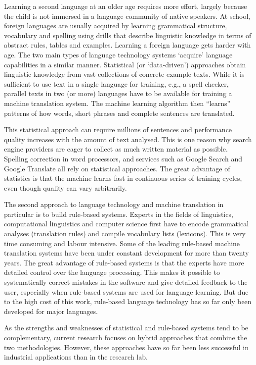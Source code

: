 \documentclass[]{../../metanetpaper}
\begin{document}
\begin{multicols}{2}
Learning a second language at an older age requires more effort, largely
because the child is not immersed in a language community of native speakers.
At school, foreign languages are usually acquired by learning grammatical
structure, vocabulary and spelling using drills that describe linguistic
knowledge in terms of abstract rules, tables and examples. Learning a foreign
language gets harder with age.
The two main types of language technology systems ‘acquire’ language
capabilities in a similar manner. Statistical (or ‘data-driven’) approaches
obtain linguistic knowledge from vast collections of concrete example texts.
While it is sufficient to use text in a single language for training, e.g., a
spell checker, parallel texts in two (or more) languages have to be available
for training a machine translation system. The machine learning algorithm then
“learns” patterns of how words, short phrases and complete sentences are
translated.

This statistical approach can require millions of sentences and performance
quality increases with the amount of text analysed. This is one reason why
search engine providers are eager to collect as much written material as
possible. Spelling correction in word processors, and services such as Google
Search and Google Translate all rely on statistical approaches. The great
advantage of statistics is that the machine learns fast in continuous series of
training cycles, even though quality can vary arbitrarily.

The second approach to language technology and machine translation in
particular is to build rule-based systems. Experts in the fields of
linguistics, computational linguistics and computer science first have to
encode grammatical analyses (translation rules) and compile vocabulary lists
(lexicons). This is very time consuming and labour intensive. Some of the
leading rule-based machine translation systems have been under constant
development for more than twenty years. The great advantage of rule-based
systems is that the experts have more detailed control over the language
processing. This makes it possible to systematically correct mistakes in the
software and give detailed feedback to the user, especially when rule-based
systems are used for language learning. But due to the high cost of this work,
rule-based language technology has so far only been developed for major
languages.

As the strengths and weaknesses of statistical and rule-based systems tend to
be complementary, current research focuses on hybrid approaches that combine
the two methodologies. However, these approaches have so far been less
successful in industrial applications than in the research lab.


\end{multicols}
\end{document}
